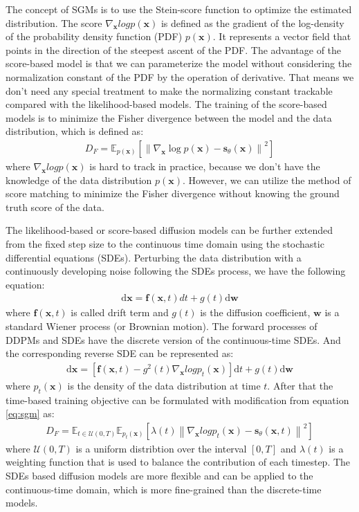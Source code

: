 \documentclass[12pt,DIV14,BCOR12mm,a4paper,footinclude=false,headinclude,parskip=half-,twoside,openright,cleardoublepage=empty,toc=index,bibliography=totoc,listof=totoc]{scrreprt}
\numberwithin{equation}{chapter}
\begin{document}
The concept of SGMs is to use the Stein-score function to optimize the estimated distribution. The score $\nabla_{\mathbf{x}}log p(\mathbf{x})$ is defined as the gradient of the log-density of the probability density function (PDF) $p(\mathbf{x})$. It represents a vector field that points in the direction of the steepest ascent of the PDF. The advantage of the score-based model is that we can parameterize the model without considering the normalization constant of the PDF by the operation of derivative. That means we don't need any special treatment to make the normalizing constant trackable compared with the likelihood-based models. The training of the score-based models is to minimize the Fisher divergence between the model and the data distribution, which is defined as:
\begin{align}\label{eq:sgm}
  D_{F} = \mathbb{E}_{p(\mathbf{x})}\left[\left\lVert\nabla_{\mathbf{x}}\log p(\mathbf{x}) - \mathbf{s}_{\theta}(\mathbf{x})\right\rVert^{2}\right]
\end{align}
where $\nabla_{\mathbf{x}}log p(\mathbf{x})$ is hard to track in practice, because we don't have the knowledge of the data distribution $p(\mathbf{x})$. However, we can utilize the method of score matching \cite{10.5555/1046920.1088696,6795935} to minimize the Fisher divergence without knowing the ground truth score of the data.

The likelihood-based or score-based diffusion models can be further extended from the fixed step size to the continuous time domain using the stochastic differential equations (SDEs). Perturbing the data distribution with a continuously developing noise following the SDEs process, we have the following equation:
\begin{align}
  \text{d}\mathbf{x}=\mathbf{f}(\mathbf{x},t)dt + g(t)\text{d}\mathbf{w}
\end{align}
where $\mathbf{f}(\mathbf{x},t)$ is called drift term and $g(t)$ is the diffusion coefficient, $\mathbf{w}$ is a standard Wiener process (or Brownian motion). The forward processes of DDPMs and SDEs have the discrete version of the continuous-time SDEs. And the corresponding reverse SDE can be represented as:
\begin{align}
  \text{d}\mathbf{x}=\left[\mathbf{f}(\mathbf{x},t)-g^{2}(t)\nabla_{\mathbf{x}}log p_{t}(\mathbf{x})\right]\text{d}t + g(t)\text{d}\mathbf{w}
\end{align}
where $p_{t}(\mathbf{x})$ is the density of the data distribution at time $t$. After that the time-based training objective can be formulated with modification from equation \ref{eq:sgm} as:
\begin{align}
  D_{F} = \mathbb{E}_{t\in \mathcal{U}(0,T)} \mathbb{E}_{p_{t}(\mathbf{x})}\left[\lambda(t)\left\lVert\nabla_{\mathbf{x}}log p_{t}(\mathbf{x}) - \mathbf{s}_{\theta}(\mathbf{x},t)\right\rVert^{2}\right]
\end{align}
where $\mathcal{U}(0,T)$ is a uniform distribtion over the interval $[0,T]$ and $\lambda(t)$ is a weighting function that is used to balance the contribution of each timestep. The SDEs based diffusion models are more flexible and can be applied to the continuous-time domain, which is more fine-grained than the discrete-time models.
\end{document}
